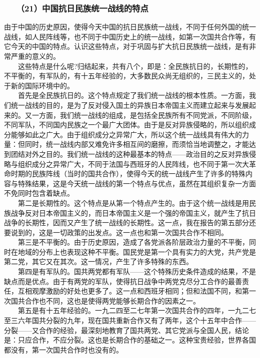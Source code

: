 \documentclass[cn,11pt,chinese]{elegantbook}
\def\myformat#1{\hfil\hfil #1}
\begin{document}
\subsubsection*{\myformat{　　（21）中国抗日民族统一战线的特点}}
由于中国的历史原因，使得今天中国的抗日民族统一战线，不同于任何外国的统一战线，如人民阵线等，也不同于中国历史上的统一战线，如第一次国共合作等，有它今天的中国的特点。认识这些特点，对于巩固与扩大抗日民族统一战线，是有非常严重的意义的。\\
　　这些特点是什么呢?归结起来，共有八个，即是：全民族抗日的，长期性的，不平衡的，有军队的，有十五年经验的，大多数民众尚无组织的，三民主义的，处于新的国际环境中的。\\
　　首先是全民族抗日的。这个特点规定了我们统一战线的根本性质。一方面，我们统一战线的目的，是为了反对侵入国土的异族日本帝国主义而建立起来与发展起来的。又一方面，我们统一战线的组成，是包括全民族所有不同党派，不同阶级，不同军队，不同国内民族之一个最广大团体。由于是反对异族侵略的，所以组织成分能够如此之广大。由于组织成分之异常广大，所以这个统一战线具有伟大的力量：但同时，统一战线内部又难免许多相互间的磨擦，而须恰当地调整之，才能达到团结对外之目的。我们统一战线的这种最基本的特点——政治目的之反对异族侵略与组织成分之异常广大，不同于法国与西班牙的人民阵线，也不同于第一次大革命时期的民族阵线（当时的国共合作），使得今天的统一战线产生了许多的特殊内容与特殊结果，这是今天统一战线的第一个特点与优点，虽然在其组织复杂一方面不免同时包含着缺点。\\
　　第二是长期性的。这个特点是从第一个特点产生的。由于这个统一战线是用民族战争反对日本帝国主义的，而日本帝国主义是一个强的帝国主义，就产生了抗日战争的长期性，因而又产生了统一战线的长期性。这一点，我在报告的第五部分还要说到的，这是一切政策的出发点。这一点也和第一次国共合作不相同。\\
　　第三是不平衡的。由于历史原因，造成了各党派各阶层政治力量的不平衡，同时在地域的分布上也表现这种不平衡。国民党是第一个具有实力的大党，共产党是第二党，其它又在其次。这一情况，产生了许多特殊的东西。\\
　　第四是有军队的。国共两党都有军队——这个特殊历史条件造成的结果，不是缺点而是优点。由于有两党的军队，使得抗日战争中两党克尽分工合作的最善责任，互相观摩激励的好处也更多了。这一点和西班牙相同；但和法国不同，和第一次国共合作也不同，这也是使得两党能够长期合作的因素之一。\\
　　第五是有十五年经验的。一九二四至二七年第一次国共合作的四年，一九二七至三六年国共分裂的九年，现在国共重新合作又有了两年，这个十五年中合作——分裂——又合作的经验，最深刻地教育了国共两党、其它党派与全国人民，结论是：只应合作，不应分裂。这也是长期合作的基础之一。这种宝贵经验，世界各国都没有，第一次国共合作时也没有的。\\
\end{document}
